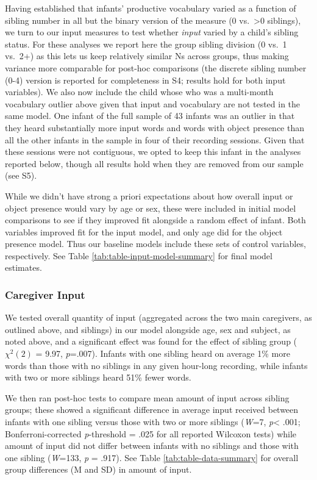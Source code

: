 \documentclass[
  english,
  man,floatsintext]{apa6}
\begin{document}
Having established that infants' productive vocabulary varied as a function of sibling number in all but the binary version of the measure (0 vs.~\textgreater0 siblings), we turn to our input measures to test whether \emph{input} varied by a child's sibling status. For these analyses we report here the group sibling division (0 vs.~1 vs.~2+) as this lets us keep relatively similar Ns across groups, thus making variance more comparable for post-hoc comparisons (the discrete sibling number (0-4) version is reported for completeness in S4; results hold for both input variables). We also now include the child whose who was a multi-month vocabulary outlier above given that input and vocabulary are not tested in the same model. One infant of the full sample of 43 infants was an outlier in that they heard substantially more input words and words with object presence than all the other infants in the sample in four of their recording sessions. Given that these sessions were not contiguous, we opted to keep this infant in the analyses reported below, though all results hold when they are removed from our sample (see S5).

While we didn't have strong a priori expectations about how overall input or object presence would vary by age or sex, these were included in initial model comparisons to see if they improved fit alongside a random effect of infant. Both variables improved fit for the input model, and only age did for the object presence model. Thus our baseline models include these sets of control variables, respectively. See Table \ref{tab:table-input-model-summary} for final model estimates.

\hypertarget{caregiver-input}{%
\subsubsection{Caregiver Input}\label{caregiver-input}}

We tested overall quantity of input (aggregated across the two main caregivers, as outlined above, and siblings) in our model alongside age, sex and subject, as noted above, and a significant effect was found for the effect of sibling group (\(\chi^2 (2)\) = 9.97, \emph{p}=.007). Infants with one sibling heard on average 1\% more words than those with no siblings in any given hour-long recording, while infants with two or more siblings heard 51\% fewer words.

We then ran post-hoc tests to compare mean amount of input across sibling groups; these showed a significant difference in average input received between infants with one sibling versus those with two or more siblings (\emph{W}=7, \emph{p}\textless{} .001; Bonferroni-corrected \emph{p}-threshold = .025 for all reported Wilcoxon tests) while amount of input did not differ between infants with no siblings and those with one sibling (\emph{W}=133, \emph{p} = .917). See Table \ref{tab:table-data-summary} for overall group differences (M and SD) in amount of input.
\end{document}
